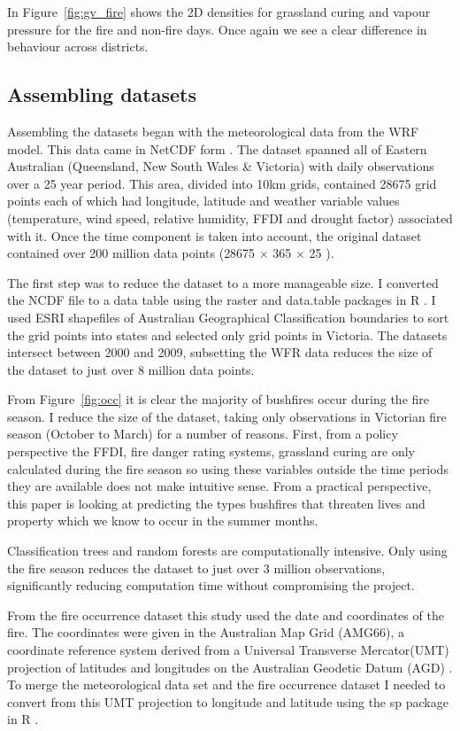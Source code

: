 \documentclass[11pt,a4paper]{article}
\begin{document}
In Figure~\ref{fig:gv_fire} shows the 2D densities for grassland curing and vapour pressure for the fire and non-fire days. Once again we see a clear difference in behaviour across districts.

\subsection{Assembling datasets}

Assembling the datasets began with the meteorological data from the WRF model. This data came in NetCDF form \citep{ncdf}. The dataset spanned all of Eastern Australian (Queensland, New South Wales \& Victoria) with daily observations over a 25 year period. This area, divided into 10km grids, contained 28675 grid points each of which had longitude, latitude and weather variable values (temperature, wind speed, relative humidity, FFDI and drought factor) associated with it. Once the time component is taken into account, the original dataset contained over 200 million data points (28675 $\times$ 365 $\times$ 25 ).

The first step was to reduce the dataset to a more manageable size. I converted the NCDF file to a data table using the raster and data.table packages in R \citep{raster, datatable}. I used ESRI shapefiles of Australian Geographical Classification boundaries \citep{ABS1259} to sort the grid points into states and selected only grid points in Victoria. The datasets intersect between 2000 and 2009, subsetting the WFR data reduces the size of the dataset to just over 8 million data points.

From Figure~\ref{fig:occ} it is clear the majority of bushfires occur during the fire season. I reduce the size of the dataset, taking only observations in Victorian fire season (October to March) for a number of reasons. First, from a policy perspective the FFDI, fire danger rating systems, grassland curing are only calculated during the fire season so using these variables outside the time periods they are available does not make intuitive sense. From a practical perspective, this paper is looking at predicting the types bushfires that threaten lives and property which we know to occur in the summer months.

Classification trees and random forests are computationally intensive. Only using the fire season reduces the dataset to just over 3 million observations, significantly reducing computation time without compromising the project.

From the fire occurrence dataset this study used the date and coordinates of the fire. The coordinates were given in the Australian Map Grid (AMG66), a coordinate reference system derived from a Universal Transverse Mercator(UMT) projection of latitudes and longitudes on the Australian Geodetic Datum (AGD) \citep{featherstone96}. To merge the meteorological data set and the fire occurrence dataset I needed to convert from this UMT projection to longitude and latitude using the sp package in R \citep{sp08}.
\end{document}
